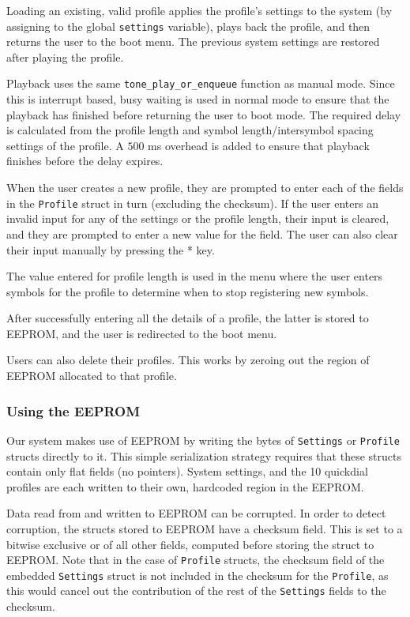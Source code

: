\documentclass[11pt,a4paper,twocolumn]{scrartcl}
\begin{document}
Loading an existing, valid profile applies the profile's settings to the system (by assigning to the global \verb!settings! variable), plays back the profile, and then returns the user to the boot menu. The previous system settings are restored after playing the profile.

Playback uses the same \verb!tone_play_or_enqueue! function as manual mode. Since this is interrupt based, busy waiting is used in normal mode to ensure that the playback has finished before returning the user to boot mode. The required delay is calculated from the profile length and symbol length/intersymbol spacing settings of the profile. A $500$ ms overhead is added to ensure that playback finishes before the delay expires.

When the user creates a new profile, they are prompted to enter each of the fields in the \verb!Profile! struct in turn (excluding the checksum). If the user enters an invalid input for any of the settings or the profile length, their input is cleared, and they are prompted to enter a new value for the field. The user can also clear their input manually by pressing the * key.

The value entered for profile length is used in the menu where the user enters symbols for the profile to determine when to stop registering new symbols. 

After successfully entering all the details of a profile, the latter is stored to EEPROM, and the user is redirected to the boot menu.

Users can also delete their profiles. This works by zeroing out the region of EEPROM allocated to that profile.

\subsubsection{Using the EEPROM}

Our system makes use of EEPROM by writing the bytes of \verb!Settings! or \verb!Profile! structs directly to it. This simple serialization strategy requires that these structs contain only flat fields (no pointers). System settings, and the 10 quickdial profiles are each written to their own, hardcoded region in the EEPROM.

Data read from and written to EEPROM can be corrupted. In order to detect corruption, the structs stored to EEPROM have a checksum field. This is set to a bitwise exclusive or of all other fields, computed before storing the struct to EEPROM. Note that in the case of \verb!Profile! structs, the checksum field of the embedded \verb!Settings! struct is not included in the checksum for the \verb!Profile!, as this would cancel out the contribution of the rest of the \verb!Settings! fields to the checksum.
\end{document}
